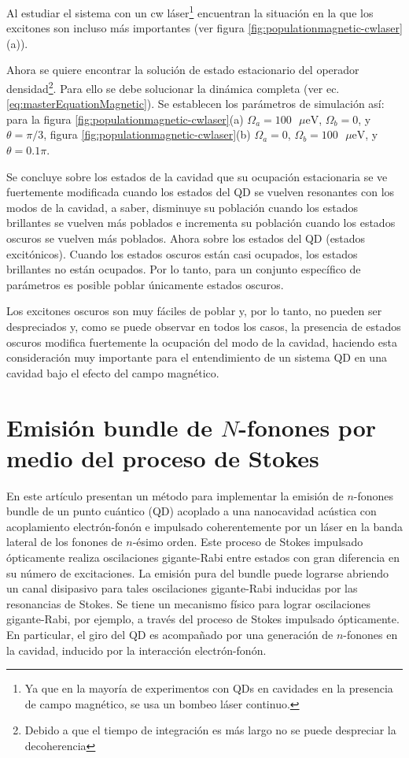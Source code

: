 \documentclass[../main.tex]{subfiles}
\begin{document}
Al estudiar el sistema con un cw láser\footnote{Ya que en la mayoría de experimentos con QDs en cavidades en la presencia de campo magnético, se usa un bombeo láser continuo.} encuentran la situación en la que los excitones son incluso más importantes (ver figura \ref{fig:populationmagnetic-cwlaser}(a)).

Ahora se quiere encontrar la solución de estado estacionario del operador densidad\footnote{Debido a que el tiempo de integración es más largo no se puede despreciar la decoherencia}. Para ello se debe solucionar la dinámica completa (ver ec. \ref{eq:masterEquationMagnetic}). Se establecen los parámetros de simulación así: para la figura \ref{fig:populationmagnetic-cwlaser}(a) $\Omega_a = 100\text{ $\mu$eV}$, $\Omega_b = 0$, y $\theta = \pi/3$, figura \ref{fig:populationmagnetic-cwlaser}(b) $\Omega_a = 0$, $\Omega_b = 100\text{ $\mu$eV}$, y $\theta = 0.1\pi$. 

Se concluye sobre los estados de la cavidad que su ocupación estacionaria se ve fuertemente modificada cuando los estados del QD se vuelven resonantes con los modos de la cavidad, a saber, disminuye su población cuando los estados brillantes se vuelven más poblados e incrementa su población cuando los estados oscuros se vuelven más poblados. Ahora sobre los estados del QD (estados excitónicos). Cuando los estados oscuros están casi ocupados, los estados brillantes no están ocupados. Por lo tanto, para un conjunto específico de parámetros es posible poblar únicamente estados oscuros.

Los excitones oscuros son muy fáciles de poblar y, por lo tanto, no pueden ser despreciados y, como se puede observar en todos los casos, la presencia de estados oscuros modifica fuertemente la ocupación del modo de la cavidad, haciendo esta consideración muy importante para el entendimiento de un sistema QD en una cavidad bajo el efecto del campo magnético.

\section{Emisión bundle de $N$-fonones por medio del proceso de Stokes}\label{sec:StokesBundles}

En este artículo \parencite{Bin2020} presentan un método para implementar la emisión de $n$-fonones bundle de un punto cuántico (QD) acoplado a una nanocavidad acústica con acoplamiento electrón-fonón e impulsado coherentemente por un láser en la banda lateral de los fonones de $n$-ésimo orden. Este proceso de Stokes impulsado ópticamente realiza oscilaciones gigante-Rabi \parencite{Strekalov2014} entre estados con gran diferencia en su número de excitaciones. La emisión pura del bundle puede lograrse abriendo un canal disipasivo para tales oscilaciones gigante-Rabi inducidas por las resonancias de Stokes. Se tiene un mecanismo físico para lograr oscilaciones gigante-Rabi, por ejemplo, a través del proceso de Stokes impulsado ópticamente. En particular, el giro del QD es acompañado por una generación de $n$-fonones en la cavidad, inducido por la interacción electrón-fonón.
\end{document}

